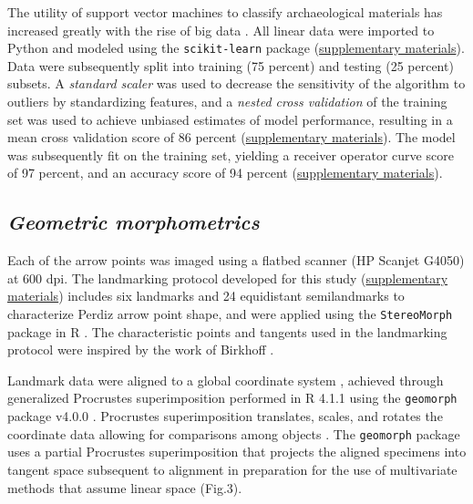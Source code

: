 \documentclass[smallextended]{svjour3}       %
\begin{document}
The utility of support vector machines to classify archaeological
materials has increased greatly with the rise of big data
\cite{RN9515,RN9516,RN9514,RN9513}. All linear data were imported to
Python and modeled using the \texttt{scikit-learn} package
\cite{scikit-learn,sklearn_api}
(\href{https://seldenlab.github.io/perdiz3/}{supplementary materials}).
Data were subsequently split into training (75 percent) and testing (25
percent) subsets. A \emph{standard scaler} was used to decrease the
sensitivity of the algorithm to outliers by standardizing features, and
a \emph{nested cross validation} of the training set was used to achieve
unbiased estimates of model performance, resulting in a mean cross
validation score of 86 percent
(\href{https://seldenlab.github.io/perdiz3/}{supplementary materials}).
The model was subsequently fit on the training set, yielding a receiver
operator curve score of 97 percent, and an accuracy score of 94 percent
(\href{https://seldenlab.github.io/perdiz3/}{supplementary materials}).

\hypertarget{geometric-morphometrics}{%
\subsection{\texorpdfstring{\emph{Geometric
morphometrics}}{Geometric morphometrics}}\label{geometric-morphometrics}}

Each of the arrow points was imaged using a flatbed scanner (HP Scanjet
G4050) at 600 dpi. The landmarking protocol developed for this study
(\href{https://seldenlab.github.io/perdiz3/}{supplementary materials})
includes six landmarks and 24 equidistant semilandmarks to characterize
Perdiz arrow point shape, and were applied using the
\texttt{StereoMorph} package in R \cite{RN8973}. The characteristic
points and tangents used in the landmarking protocol were inspired by
the work of Birkhoff \cite{RN5700}.

Landmark data were aligned to a global coordinate system
\cite{RN8102,RN8587,RN8384}, achieved through generalized Procrustes
superimposition \cite{RN8525} performed in R 4.1.1 \cite{RN8584} using
the \texttt{geomorph} package v4.0.0 \cite{RN8565}. Procrustes
superimposition translates, scales, and rotates the coordinate data
allowing for comparisons among objects \cite{RN5698,RN8525}. The
\texttt{geomorph} package uses a partial Procrustes superimposition that
projects the aligned specimens into tangent space subsequent to
alignment in preparation for the use of multivariate methods that assume
linear space \cite{RN8511,RN8384} (Fig.3).
\end{document}
